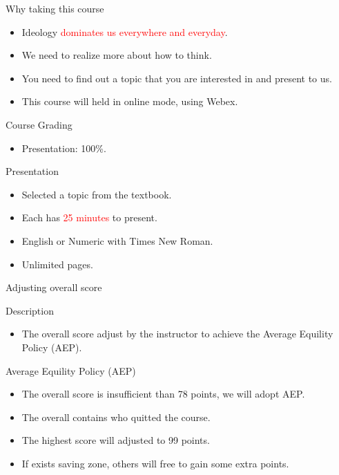 \documentclass{beamer}
\begin{document}
\begin{frame}{Why taking this course}
\begin{itemize}
\item Ideology \textcolor{red}{dominates us everywhere and everyday}.
\item We need to realize more about how to think.
\item You need to find out a topic that you are interested in and present to us.
\item This course will held in online mode, using Webex.
\end{itemize}
\end{frame}
\begin{frame}{Course Grading}
\begin{itemize}
\item Presentation: 100\%.
\end{itemize}
\end{frame}
\begin{frame}{Presentation}
\begin{itemize}
\item Selected a topic from the textbook.
\item Each has \textcolor{red}{25 minutes} to present.
\item English or Numeric with Times New Roman.
\item Unlimited pages.
\end{itemize}
\end{frame}
\begin{frame}{Adjusting overall score}
\begin{block}{Description}
\begin{itemize}
\item The overall score adjust by the instructor to achieve the Average Equility Policy (AEP).
\end{itemize}
\end{block}
\begin{block}{Average Equility Policy (AEP)}
\begin{itemize}
\item The overall score is insufficient than 78 points, we will adopt AEP.
\item The overall contains who quitted the course.
\item The highest score will adjusted to 99 points.
\item If exists saving zone, others will free to gain some extra points.
\end{itemize}
\end{block}
\end{frame}
\end{document}
